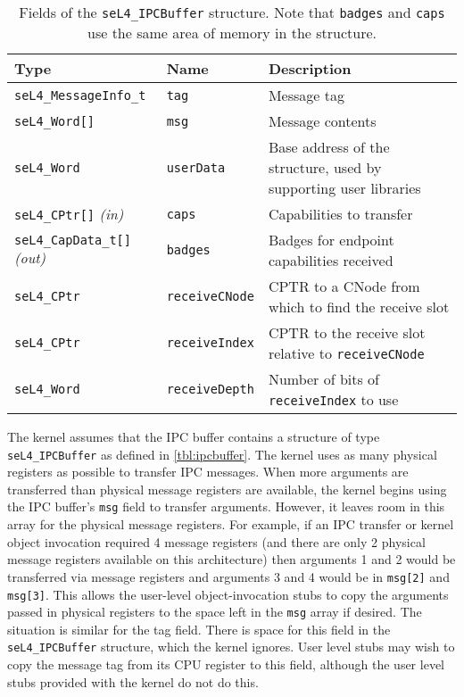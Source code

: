 
\newcommand{\ipcparam}[4]{\texttt{#1} \emph{#2}&\texttt{#3}&#4\\ }
\begin{table}[htb]
    \begin{center}
    \begin{tabularx}{\textwidth}{p{}p{}X}
      \toprule
      \textbf{Type} & \textbf{Name} & \textbf{Description} \\
      \midrule
        \ipcparam{seL4\_MessageInfo\_t}{}{tag}{Message tag}
        \ipcparam{seL4\_Word[]}{}{msg}{Message contents}
        \ipcparam{seL4\_Word}{}{userData}{Base address of the structure, used by
        supporting user libraries}
        \ipcparam{seL4\_CPtr[]}{(in)}{caps}{Capabilities to transfer}
        \ipcparam{seL4\_CapData\_t[]}{(out)}{badges}{Badges for
        endpoint capabilities received}
        \ipcparam{seL4\_CPtr}{}{receiveCNode}{CPTR to a CNode from which to
        find
        the receive slot}
        \ipcparam{seL4\_CPtr}{}{receiveIndex}{CPTR to the receive slot
        relative to \texttt{receiveCNode}}
        \ipcparam{seL4\_Word}{}{receiveDepth}{Number of bits of
        \texttt{receiveIndex} to
        use}
        \bottomrule
      \end{tabularx}
    \caption{\label{tbl:ipcbuffer}Fields of the
      \texttt{seL4\_IPCBuffer} structure.  Note that
      \texttt{badges} and \texttt{caps} use the same area of memory in
      the structure.}
    \end{center}
\end{table}

The kernel assumes that the IPC buffer contains a structure of type
\texttt{seL4\_IPCBuffer} as defined in \autoref{tbl:ipcbuffer}. The
kernel uses as many physical registers as possible to transfer IPC
messages. When more arguments are transferred than physical message
registers are available, the kernel begins using the IPC buffer's
\texttt{msg} field to transfer arguments. However, it leaves room in
this array for the physical message registers. For example, if an IPC
transfer or kernel object invocation required
4 message registers (and there are only 2 physical message registers
available on this architecture) then arguments 1 and 2 would be
transferred via message registers and arguments 3 and 4 would be in
\texttt{msg[2]} and \texttt{msg[3]}.
This allows the user-level object-invocation stubs to copy the arguments passed in physical registers to
the space left in the \texttt{msg} array if desired.
The situation is similar for the tag field.
There is space for this field in the \texttt{seL4\_IPCBuffer} structure, which the kernel ignores.
User level stubs
may wish to copy the message tag from its CPU register to this field, although
the user level stubs provided with the kernel do not do this.

